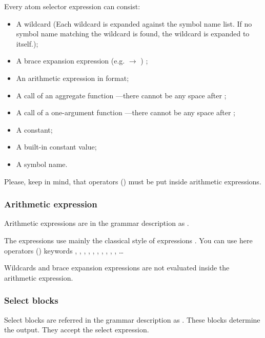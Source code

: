 Every atom selector expression can consist:
\begin{itemize}
    \item A wildcard (Each wildcard is expanded against the symbol name list.
	    If no symbol name matching the wildcard is found, the wildcard is expanded to itself.);
    \item A  brace expansion expression (e.g.  $\rightarrow$ ) \cite{bash-reference-manual};
    \item An arithmetic expression in  format;
    \item A call of an aggregate function ---\allowbreak{}the\-re cannot be any space after ;
    \item A call of a one-argument function ---there cannot be any space after ;
    \item A constant;
    \item A built-in constant value;
    \item A symbol name.
\end{itemize}

Please, keep in mind, that operators () must be put inside arithmetic expressions.

\subsubsection{Arithmetic expression}
Arithmetic expressions are in the grammar description as .

The expressions use mainly the classical  style of expressions \cite{awk-reference-manual}.  
You can use here operators () keywords \icode{\textgreater}, \icode{\textless}, \icode{\textless=}, \icode{\textgreater=}, \icode{==}, \icode{$\vert\vert$}, \icode{\&\&}, \icode{+}, \icode{-}, \icode{*}, \icode{/}\ldots{}

Wildcards and brace expansion expressions are not evaluated inside the arithmetic expression.

\subsubsection{Select blocks}
Select blocks are referred in the grammar description as .
These blocks determine the output. They accept the select expression.

